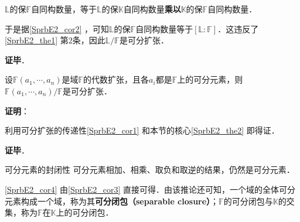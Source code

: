 $\mathbb{L}$的保$\mathbb{F}$自同构数量，等于$\mathbb{L}$的保$\mathbb{K}$自同构数量\textbf{乘以}$\mathbb{K}$的保$\mathbb{F}$自同构数量．

于是据\autoref{SprbE2_cor2} ，可知$\mathbb{L}$的保$\mathbb{F}$自同构数量等于$[\mathbb{L}:\mathbb{F}]$．这违反了\autoref{SprbE2_the1} 第$2$条，因此$\mathbb{L}/\mathbb{F}$是可分扩张．




\textbf{证毕}．





\begin{corollary}{}\label{SprbE2_cor3}
设$\mathbb{F}(a_1, \cdots, a_n)$是域$\mathbb{F}$的代数扩张，且各$a_i$都是$\mathbb{F}$上的可分元素，则$\mathbb{F}(a_1, \cdots, a_n)/\mathbb{F}$是可分扩张．
\end{corollary}

\textbf{证明}：

利用可分扩张的传递性\autoref{SprbE2_cor1} 和本节的核心\autoref{SprbE2_the2} 即得证．

\textbf{证毕}．





\begin{corollary}{可分元素的封闭性}\label{SprbE2_cor4}
可分元素相加、相乘、取负和取逆的结果，仍然是可分元素．
\end{corollary}

\autoref{SprbE2_cor4} 由\autoref{SprbE2_cor3} 直接可得．由该推论还可知，一个域的全体可分元素构成一个域，称为其\textbf{可分闭包（separable closure）}；$\mathbb{F}$的可分闭包与$\mathbb{K}$的交集，称为$\mathbb{F}$在$\mathbb{K}$上的可分闭包．











